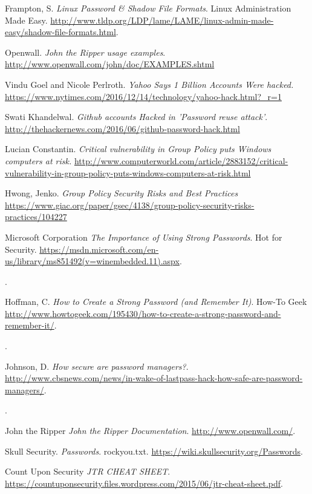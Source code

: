 \documentclass[12pt]{article}
\begin{document}
\begin{thebibliography}{9}

	Frampton, S.
	\textit{Linux Password \& Shadow File Formats}.
	Linux Administration Made Easy.
	\url{http://www.tldp.org/LDP/lame/LAME/linux-admin-made-easy/shadow-file-formats.html}.

	Openwall.
	\textit{John the Ripper usage examples}.
	\url{http://www.openwall.com/john/doc/EXAMPLES.shtml}
	
Vindu Goel and Nicole Perlroth.
\textit{Yahoo Says 1 Billion Accounts Were hacked.}
\url{https://www.nytimes.com/2016/12/14/technology/yahoo-hack.html?_r=1}

Swati Khandelwal.
\textit{Github accounts Hacked in 'Password reuse attack'}.
\url{http://thehackernews.com/2016/06/github-password-hack.html}


Lucian Constantin.
\textit{Critical vulnerability in Group Policy puts Windows computers at risk.}
\url{http://www.computerworld.com/article/2883152/critical-vulnerability-in-group-policy-puts-windows-computers-at-risk.html}

Hwong, Jenko.
\textit{Group Policy Security Risks and Best Practices}
\url{https://www.giac.org/paper/gsec/4138/group-policy-security-risks-practices/104227}

Microsoft Corporation
\textit{The Importance of Using Strong Passwords}.
Hot for Security.
\url{https://msdn.microsoft.com/en-us/library/ms851492(v=winembedded.11).aspx}.
\date{2006}.

Hoffman, C.
\textit{How to Create a Strong Password (and Remember It)}.
How-To Geek
\url{http://www.howtogeek.com/195430/how-to-create-a-strong-password-and-remember-it/}.
\date{May 2015}.

Johnson, D.
\textit{How secure are password managers?}.
\url{http://www.cbsnews.com/news/in-wake-of-lastpass-hack-how-safe-are-password-managers/}.
\date{June 2015}.

John the Ripper
\textit{John the Ripper Documentation}.
\url{http://www.openwall.com/}.

Skull Security.
\textit{Passwords}.
rockyou.txt.
\url{https://wiki.skullsecurity.org/Passwords}.

Count Upon Security
\textit{JTR CHEAT SHEET}.
\url{https://countuponsecurity.files.wordpress.com/2015/06/jtr-cheat-sheet.pdf}.


\end{thebibliography}
\end{document}
